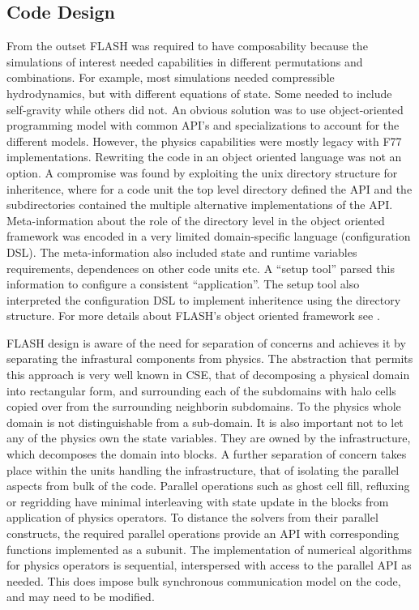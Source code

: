 

\subsection{Code Design}
From the outset FLASH was required to have composability because the
simulations of interest needed capabilities in different permutations
and combinations. For example, most simulations needed compressible
hydrodynamics, but with different equations of state. Some needed to
include self-gravity while others did not. An 
obvious solution was to use object-oriented programming model with
common API's and specializations to account for the different
models. However, the physics capabilities were mostly legacy with F77
implementations. Rewriting the code in an object oriented language was
not an option. A compromise was found by exploiting the unix directory
structure for inheritence, where for a code unit the top level
directory defined the API and the subdirectories contained the
multiple alternative implementations of the API.  Meta-information
about the role of the directory level in the object oriented framework
was encoded in a very limited domain-specific language (configuration
DSL). The meta-information also included state and runtime variables
requirements, dependences on other code units etc. A ``setup tool''
parsed this information to configure a consistent ``application''. The
setup tool also interpreted the configuration DSL to implement 
inheritence using the directory structure. For more details about
FLASH's object oriented framework see \cite{Dubey2009, Fryxell2000}.   

FLASH design is aware of the need for separation of concerns and
achieves it by separating the infrastural components
from physics. The abstraction that permits this approach is very
well known in CSE, that of decomposing a physical domain into
rectangular form, and surrounding each of the subdomains with halo
cells copied over from the surrounding neighborin subdomains. To the
physics whole domain is not distinguishable from a sub-domain. 
It is also important not to let any of the  physics own the state
variables. They are owned by the infrastructure, which 
decomposes the domain into blocks. A further separation of concern
takes place within the units handling the infrastructure, that of
isolating the parallel aspects from bulk of the code. Parallel
operations such as ghost cell fill, refluxing or regridding have
minimal interleaving with state update in the blocks from application
of physics operators. To distance the solvers from their parallel
constructs, the required parallel operations provide an API with
corresponding functions implemented as a subunit. The implementation
of numerical algorithms for physics operators is sequential,
interspersed with access to the parallel API as needed. This does
impose bulk synchronous communication model on the code, and may need
to be modified.


